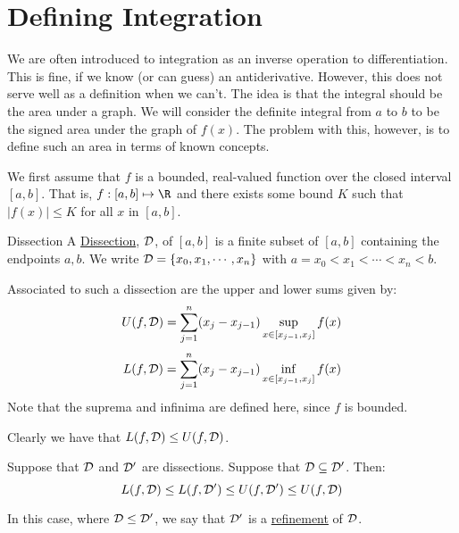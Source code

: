 \documentclass[../Main.tex]{subfiles}
\begin{document}
\section{Defining Integration}
We are often introduced to integration as an inverse operation to differentiation. This is fine, if we know (or can guess) an antiderivative. However, this does not serve well as a definition when we can't. The idea is that the integral should be the area under a graph. We will consider the definite integral from $a$ to $b$ to be the signed area under the graph of $f(x)$. The problem with this, however, is to define such an area in terms of known concepts.\par
We first assume that $f$ is a bounded, real-valued function over the closed interval $[a, b]$. That is,
$f : [a, b] \mapsto \R$ and there exists some bound $K$ such that $|f(x)| \leq K$ for all $x$ in $[a, b]$.
\begin{definition}{Dissection}
    A \underline{Dissection}, $\mathcal{D}$, of $[a, b]$ is a finite subset of $[a, b]$ containing the endpoints $a, b$. We write $\mathcal{D} = \{x_0, x_1, \cdots, x_n\}$ with $a = x_0 < x_1 < \cdots < x_n < b$.
\end{definition}
Associated to such a dissection are the upper and lower sums given by:
\begin{equation}
    U(f, \mathcal{D}) = \sum_{j = 1}^n (x_j - x_{j - 1}) \sup_{x \in [x_{j-1}, x_j]} f(x)
    \label{eqnUpperSum}
\end{equation}
\begin{equation}
    L(f, \mathcal{D}) = \sum_{j = 1}^n (x_j - x_{j - 1}) \inf_{x \in [x_{j-1}, x_j]} f(x)
    \label{eqnLowerSum}
\end{equation}
Note that the suprema and infinima are defined here, since $f$ is bounded.\par
Clearly we have that $L(f, \mathcal{D}) \leq U(f, \mathcal{D})$.
\begin{lemma}
    Suppose that $\mathcal{D}$ and $\mathcal{D}'$ are dissections. Suppose that $\mathcal{D} \subseteq \mathcal{D}'$. Then:
    \begin{equation*}
        L(f, \mathcal{D}) \leq L(f, \mathcal{D}') \leq U(f, \mathcal{D}') \leq U(f, \mathcal{D})
    \end{equation*}
    \label{lemRefinement}
\end{lemma}
\begin{remark}
    In this case, where $\mathcal{D} \leq \mathcal{D}'$, we say that $\mathcal{D}'$ is a \underline{refinement} of $\mathcal{D}$.
\end{remark}
\end{document}
